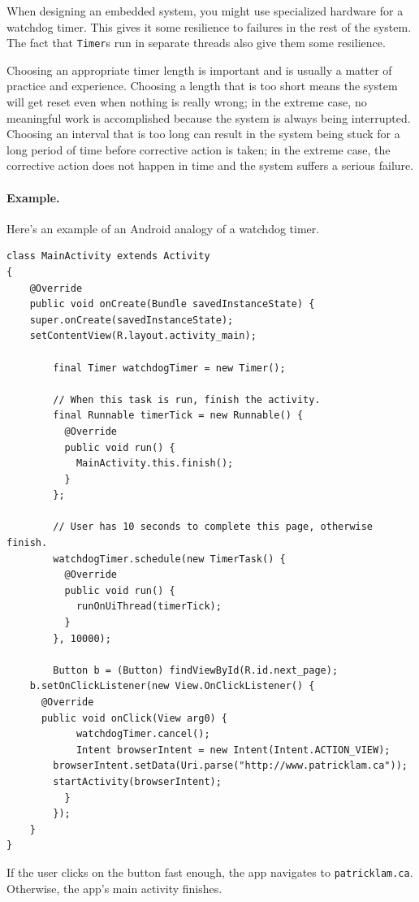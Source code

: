When designing an embedded system, you might use specialized hardware
for a watchdog timer. This gives it some resilience to failures in the
rest of the system. The fact that {\tt Timer}s run in separate threads
also give them some resilience.

Choosing an appropriate timer length is important and is usually a matter of practice and experience. Choosing a length that is too short means the system will get reset even when nothing is really wrong; in the extreme case, no meaningful work is accomplished because the system is always being interrupted. Choosing an interval that is too long can result in the system being stuck for a long period of time before corrective action is taken; in the extreme case, the corrective action does not happen in time and the system suffers a serious failure.

\paragraph{Example.}
Here's an example of an Android analogy of a watchdog timer.

{\scriptsize \begin{verbatim}
class MainActivity extends Activity
{
    @Override
    public void onCreate(Bundle savedInstanceState) {
	super.onCreate(savedInstanceState);
	setContentView(R.layout.activity_main);

        final Timer watchdogTimer = new Timer();

        // When this task is run, finish the activity.
        final Runnable timerTick = new Runnable() {
          @Override 
          public void run() {
            MainActivity.this.finish();
          }
        };

        // User has 10 seconds to complete this page, otherwise finish.
        watchdogTimer.schedule(new TimerTask() {
          @Override
          public void run() {
            runOnUiThread(timerTick);
          }
        }, 10000);

        Button b = (Button) findViewById(R.id.next_page);
	b.setOnClickListener(new View.OnClickListener() {
	  @Override
	  public void onClick(View arg0) {
            watchdogTimer.cancel();
            Intent browserIntent = new Intent(Intent.ACTION_VIEW);
	    browserIntent.setData(Uri.parse("http://www.patricklam.ca"));
	    startActivity(browserIntent);
          }
        });
    }
}
\end{verbatim}}

If the user clicks on the button fast enough,
the app navigates to \texttt{patricklam.ca}. Otherwise, the app's main activity finishes.

